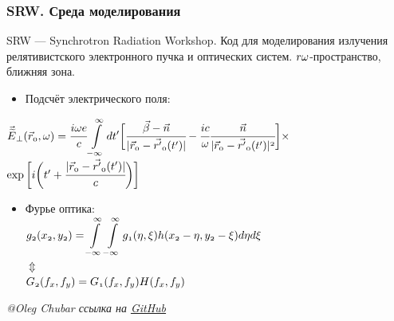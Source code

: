 \documentclass[14pt, hyperref = {colorlinks}]{beamer}
\begin{document}
\small
\begin{frame}
\frametitle{SRW. Среда моделирования}\label{t1}
SRW --- Synchrotron Radiation Workshop. Код для моделирования излучения релятивистского электронного пучка и оптических систем.
$\mathnormal{r\omega}$-пространство, ближняя зона.\\
\begin{itemize}
	\item Подсчёт электрического поля:\\
\end{itemize}
	\hspace{25pt}$\mathnormal{\vec{\widetilde{E}}_{\bot}(\vec{r}_0, \omega) = 
	\cfrac{i\omega e}{c}\displaystyle\int\limits_{-\infty}^{\infty} dt'\bigg[\cfrac{\vec{\beta} - \vec{n}}{|\vec{r}_0 - \vec{r'}_0(t')|} - \cfrac{ic}{\omega}\cfrac{\vec{n}}{|\vec{r}_0 - \vec{r'}_0(t')|^2}\bigg]\times}$\\
	\hspace{195pt}$\mathnormal{\exp\bigg[i\bigg(t' + \cfrac{|\vec{r}_0 - \vec{r'}_0(t')|}{c}\bigg)\bigg]}$
\vspace{-10pt}
\begin{itemize}	
	\item Фурье оптика:\\
	\centering
	\vspace{-10pt}
	$\mathnormal{g_2(x_2, y_2) = \displaystyle\int\limits_{-\infty}^{\infty}\displaystyle\int\limits_{-\infty}^{\infty}
		g_1(\eta, \xi) h(x_2 - \eta, y_2 - \xi)}d\eta d\xi$ \\
	\vspace{-6pt}
	$\Updownarrow$\\
	\vspace{6pt}
	$\mathnormal{G_2(f_x, f_y) = G_1(f_x, f_y)H(f_x, f_y)}$
\end{itemize}
\tiny{\textit{@Oleg Chubar ссылка на \href{https://github.com/ochubar/SRW.git}{GitHub}}}
\end{frame}
\end{document}

